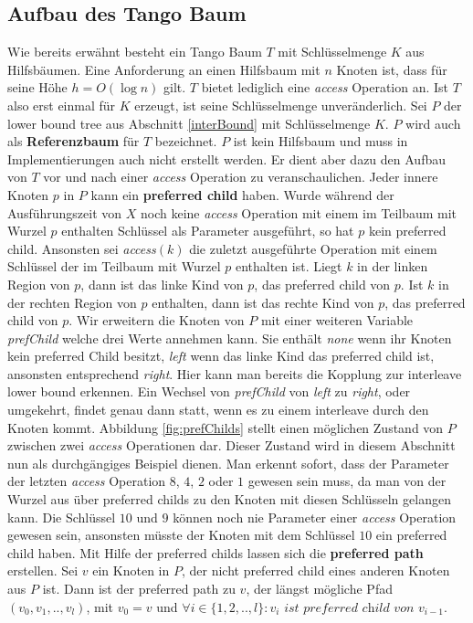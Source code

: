 \documentclass[a4paper,12pt]{article}
\begin{document}
\subsection{Aufbau des Tango Baum} \label{aufbauDesTango}
Wie bereits erwähnt besteht ein Tango Baum $T$ mit Schlüsselmenge $K$ aus Hilfsbäumen. Eine Anforderung an einen Hilfsbaum mit $n$ Knoten ist, dass für seine Höhe $h = O\left(\log n\right)$ gilt. $T$ bietet lediglich eine \textit{access} Operation an. Ist $T$ also erst einmal für $K$ erzeugt, ist seine Schlüsselmenge unveränderlich. Sei $P$ der lower bound tree aus Abschnitt \ref{interBound} mit Schlüsselmenge $K$. $P$ wird auch als \textbf{Referenzbaum} für $T$ bezeichnet. $P$ ist kein Hilfsbaum und muss in Implementierungen auch nicht erstellt werden. Er dient aber dazu den Aufbau von $T$ vor und nach einer \textit{access} Operation zu veranschaulichen. Jeder innere Knoten $p$ in $P$ kann ein \textbf{preferred child} haben.  Wurde während der Ausführungszeit von $X$ noch keine \textit{access} Operation mit einem im Teilbaum mit Wurzel $p$ enthalten Schlüssel als Parameter ausgeführt, so hat $p$ kein preferred child. Ansonsten sei \textit{access}$\left(k\right)$ die zuletzt ausgeführte Operation mit einem Schlüssel der im Teilbaum mit Wurzel $p$ enthalten ist. Liegt $k$ in der linken Region von $p$, dann ist das linke Kind von $p$, das preferred child von $p$. Ist $k$ in der rechten Region von $p$ enthalten, dann ist das rechte Kind von $p$, das preferred child von $p$. Wir erweitern die Knoten von $P$ mit einer weiteren Variable \textit{prefChild} welche drei Werte annehmen kann. Sie enthält \textit{none} wenn ihr Knoten kein preferred Child besitzt, \textit{left} wenn das linke Kind das preferred child ist, ansonsten entsprechend \textit{right}. Hier kann man bereits die Kopplung zur interleave lower bound erkennen. Ein Wechsel von \textit{prefChild}  von \textit{left} zu \textit{right}, oder umgekehrt, findet genau dann statt, wenn es zu einem interleave durch den Knoten kommt. Abbildung \ref{fig:prefChilds} stellt einen möglichen Zustand von $P$ zwischen zwei \textit{access} Operationen dar. Dieser Zustand wird in diesem Abschnitt nun als durchgängiges Beispiel dienen. Man erkennt sofort, dass der Parameter der letzten \textit{access} Operation $8$, $4$, $2$ oder $1$ gewesen sein muss, da man von der Wurzel aus über preferred childs zu den Knoten mit diesen Schlüsseln gelangen kann. Die Schlüssel $10$ und $9$ können noch nie Parameter einer \textit{access} Operation gewesen sein, ansonsten müsste der Knoten mit dem Schlüssel $10$ ein preferred child haben. Mit Hilfe der preferred childs lassen sich die \textbf{preferred path} erstellen. Sei $v$ ein Knoten in $P$, der nicht preferred child eines anderen Knoten aus $P$ ist. Dann ist der preferred path zu $v$, der längst mögliche Pfad $\left(v_0, v_1,..,v_l\right)$, mit $v_0 = v$ und $\forall i \in \{1,2,..,l\} \colon v_i \textit{ ist preferred child von }v_{i-1   }$.  
\end{document}
